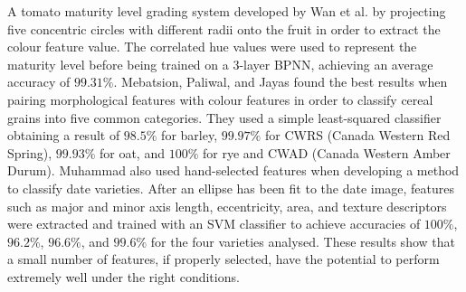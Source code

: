 \documentclass[fleqn,twoside,12pt]{report}
\begin{document}
A tomato maturity level grading system developed by Wan et al.\cite{wan} by projecting five concentric circles with different radii onto the fruit in order to extract the colour feature value. The correlated hue values were used to represent the maturity level before being trained on a 3-layer BPNN, achieving an average accuracy of $99.31\%$. Mebatsion, Paliwal, and Jayas \cite{mebatsion} found the best results when pairing morphological features with colour features in order to classify cereal grains into five common categories. They used a simple least-squared classifier obtaining a result of $98.5\%$ for barley, $99.97\%$ for CWRS (Canada Western Red Spring), $99.93\%$ for oat, and $100\%$ for rye and CWAD (Canada Western Amber Durum). Muhammad \cite{muhammad} also used hand-selected features when developing a method to classify date varieties. After an ellipse has been fit to the date image, features such as major and minor axis length, eccentricity, area, and texture descriptors were extracted and trained with an SVM classifier to achieve accuracies of $100\%$, $96.2\%$, $96.6\%$, and $99.6\%$ for the four varieties analysed. These results show that a small number of features, if properly selected, have the potential to perform extremely well under the right conditions.
\end{document}
